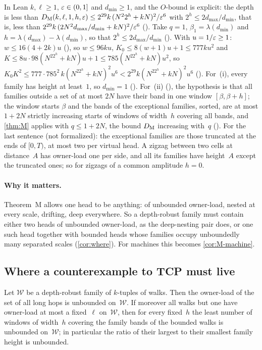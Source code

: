 \begin{outline}
In Lean $k,\ell\ge1$, $\varepsilon\in(0,1]$ and $d_{\min}\ge1$, and the $O$-bound is explicit: the depth is less than
$D_{\mathrm M}(k,\ell,1,h,\varepsilon)\le2^{29}k\,(N^22^h+kN)^2/\varepsilon^6$ with $2^h\le2d_{\max}/d_{\min}$, that is, less than
$2^{29}k\,(2N^2d_{\max}/d_{\min}+kN)^2/\varepsilon^6$ (). Take $q=1$, $\beta_1=\lambda(d_{\min})$ and
$h=\lambda(d_{\max})-\lambda(d_{\min})$, so that $2^h\le2d_{\max}/d_{\min}$ (). With $u=1/\varepsilon\ge1$:
$w\le16(4+2k)u$ (), so $w\le96ku$, $K_0\le8(w+1)u+1\le777ku^2$ and $K\le8u\cdot98(N^22^h+kN)u+1\le785(N^22^h+kN)u^2$,
so $K_0K^2\le777\cdot785^2\,k(N^22^h+kN)^2u^6<2^{29}k(N^22^h+kN)^2u^6$ (). For~(i), every family has height
at least~$1$, so $d_{\min}=1$ (). For~(ii) (), the hypothesis is that all families outside a
set of at most $2N$ have their band in one window $[\beta,\beta+h]$; the window starts $\beta$ and the bands of the
exceptional families, sorted, are at most $1+2N$ strictly increasing starts of windows of width~$h$ covering all bands, and
\cref{thm:M} applies with $q\le1+2N$, the bound $D_{\mathrm M}$ increasing with~$q$ (). For the last sentence (not
formalized): the exceptional families are those truncated at the ends of $[0,T)$, at most two per virtual head. A zigzag
between two cells at distance~$A$ has owner-load one per side, and all its families have height~$A$ except the truncated
ones; so for zigzags of a common amplitude $h=0$.
\end{outline}

\paragraph{Why it matters.} Theorem~M allows one head to be anything: of unbounded owner-load, nested at every scale,
drifting, deep everywhere. So a depth-robust family must contain either two heads of unbounded owner-load, as the
deep-nesting pair does, or one such head together with bounded heads whose families occupy unboundedly many separated
scales (\cref{cor:where}). For machines this becomes \cref{cor:M-machine}.

\subsection{Where a counterexample to TCP must live}\label{sec:one-counter}

\begin{corollary}\label{cor:where}
Let $\mathcal W$ be a depth-robust family of $k$-tuples of walks. Then the owner-load of the set of all long hops is
unbounded on~$\mathcal W$. If moreover all walks but one have owner-load at most a fixed~$\ell$ on~$\mathcal W$, then for
every fixed~$h$ the least number of windows of width~$h$ covering the family bands of the bounded walks is unbounded
on~$\mathcal W$; in particular the ratio of their largest to their smallest family height is unbounded.
\end{corollary}

